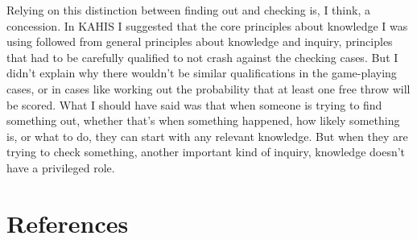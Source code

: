 \documentclass[
  11pt,
  letterpaper,
  DIV=11,
  numbers=noendperiod,
  twoside]{scrartcl}
\begin{document}
Relying on this distinction between finding out and checking is, I
think, a concession. In KAHIS I suggested that the core principles about
knowledge I was using followed from general principles about knowledge
and inquiry, principles that had to be carefully qualified to not crash
against the checking cases. But I didn't explain why there wouldn't be
similar qualifications in the game-playing cases, or in cases like
working out the probability that at least one free throw will be scored.
What I should have said was that when someone is trying to find
something out, whether that's when something happened, how likely
something is, or what to do, they can start with any relevant knowledge.
But when they are trying to check something, another important kind of
inquiry, knowledge doesn't have a privileged role.

\section*{References}\label{references}
\end{document}
